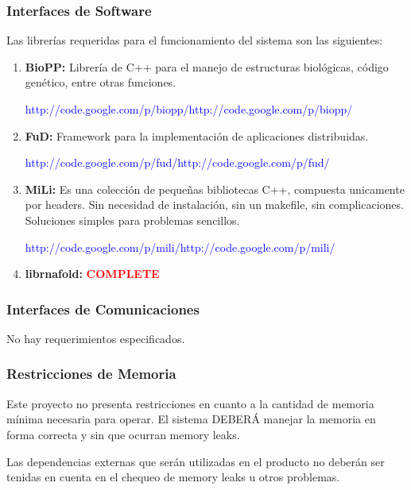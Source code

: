\documentclass[12pt,a4paper,english,spanish]{article}
\begin{document}
	\subsubsection{Interfaces de Software}
		Las librerías requeridas para el funcionamiento del sistema son las siguientes:
		\begin{enumerate}
			\item \textbf{BioPP:} Librería de C++ para el manejo de estructuras biológicas, código
						genético, entre otras funciones. 
						\par \noindent \textcolor{blue}{http://code.google.com/p/biopp/http://code.google.com/p/biopp/}

			\item \textbf{FuD:} Framework para la implementación de aplicaciones distribuidas. 
						\par \noindent \textcolor{blue}{http://code.google.com/p/fud/http://code.google.com/p/fud/}

			\item \textbf{MiLi:} Es una colección de pequeñas bibliotecas C++, compuesta unicamente por headers. Sin necesidad de instalación, sin un 									makefile, sin complicaciones. Soluciones simples para problemas sencillos.
						\par \noindent \textcolor{blue}{http://code.google.com/p/mili/http://code.google.com/p/mili/}

			\item \textbf{librnafold:} \textbf{\textcolor{red}{COMPLETE}}
		\end{enumerate}

	\subsubsection{Interfaces de Comunicaciones}
		No hay requerimientos especificados.

	\subsubsection{Restricciones de Memoria}	
		\par Este proyecto no presenta restricciones en cuanto a la cantidad de memoria mínima necesaria para operar. El sistema DEBERÁ manejar la memoria 			en forma correcta y sin que ocurran memory leaks.
		\par Las dependencias externas que serán utilizadas en el producto no deberán ser tenidas en cuenta en el chequeo 
		de memory leaks u otros problemas.
		
\end{document}
